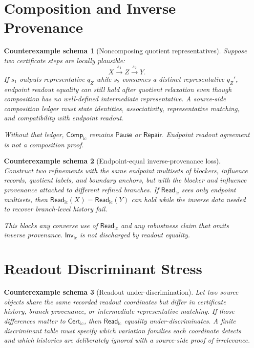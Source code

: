 \documentclass[11pt]{article}
\newcommand{\CertLC}{\mathsf{Cert}_{\mathrm{lc}}}
\newcommand{\ReadLC}{\mathsf{Read}_{\mathrm{lc}}}
\newcommand{\CompLC}{\mathsf{Comp}_{\mathrm{lc}}}
\newcommand{\InvLC}{\mathsf{Inv}_{\mathrm{lc}}}
\newcommand{\Pause}{\mathsf{Pause}}
\newcommand{\Repair}{\mathsf{Repair}}
\newtheorem{counterexample}{Counterexample schema}
\begin{document}
\section{Composition and Inverse Provenance}

\begin{counterexample}[Noncomposing quotient representatives]
Suppose two certificate steps are locally plausible:
\[
    X \xrightarrow{s_1} Z \xrightarrow{s_2} Y .
\]
If \(s_1\) outputs representative \(q_Z\) while \(s_2\) consumes a
distinct representative \(q_Z'\), endpoint readout equality can still
hold after quotient relaxation even though composition has no
well-defined intermediate representative. A source-side composition
ledger must state identities, associativity, representative matching,
and compatibility with endpoint readout.

Without that ledger, \(\CompLC\) remains \(\Pause\) or \(\Repair\).
Endpoint readout agreement is not a composition proof.
\end{counterexample}

\begin{counterexample}[Endpoint-equal inverse-provenance loss]
Construct two refinements with the same endpoint multisets of blockers,
influence records, quotient labels, and boundary anchors, but with the
blocker and influence provenance attached to different refined
branches. If \(\ReadLC\) sees only endpoint multisets, then
\(\ReadLC(X)=\ReadLC(Y)\) can hold while the inverse data needed to
recover branch-level history fail.

This blocks any converse use of \(\ReadLC\) and any robustness claim
that omits inverse provenance. \(\InvLC\) is not discharged by readout
equality.
\end{counterexample}

\section{Readout Discriminant Stress}

\begin{counterexample}[Readout under-discrimination]
Let two source objects share the same recorded readout coordinates but
differ in certificate history, branch provenance, or intermediate
representative matching. If those differences matter to \(\CertLC\),
then \(\ReadLC\) equality under-discriminates. A finite discriminant
table must specify which variation families each coordinate detects
and which histories are deliberately ignored with a source-side proof
of irrelevance.
\end{counterexample}
\end{document}
